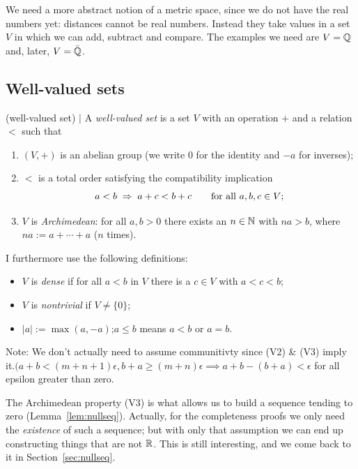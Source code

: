 We need a more abstract notion of a metric space, since we do not have the
real numbers yet: distances cannot be real numbers. Instead they take values
in a set $V$ in which we can add, subtract and compare. The examples we need
are $V=\mathbb{Q}$ and, later, $V=\bar{\mathbb{Q}}$.

\subsection{Well-valued sets}

\begin{definition} (well-valued set) $\mid$ \label{def:wellvalued}
A \emph{well-valued set} is a set $V$ with an operation $+$ and a relation $<$
such that
\begin{enumerate}[nosep,leftmargin=3em,label=(V\arabic*)]
    \item $(V,+)$ is an abelian group (we write $0$ for the identity and
    $-a$ for inverses);
    \item $<$ is a total order satisfying the compatibility implication
    \[ a<b \;\Rightarrow\; a+c<b+c \qquad\text{for all } a,b,c\in V; \]
    \item $V$ is \emph{Archimedean}: for all $a,b>0$ there exists an
    $n\in\mathbb{N}$ with $na>b$, where $na := a+\cdots+a$ ($n$ times).
\end{enumerate}
I furthermore use the following definitions:
\begin{itemize}[nosep,leftmargin=3em]
  \item $V$ is \emph{dense} if for all $a<b$ in $V$ there is a $c\in V$ with $a<c<b$;
  \item $V$ is \emph{nontrivial} if $V\ne\{0\}$;
  \item $|a| := \max(a,-a)$;\quad $a\le b$ means $a<b$ or $a=b$.
\end{itemize}
\end{definition}
Note: We don't actually need to assume communitivty since (V2) \& (V3) imply it.$ (a + b < (m+n+1) \epsilon, b+a \geq (m+n) \epsilon  \implies a+b - (b+a) < \epsilon $ for all epsilon greater than zero. 

The Archimedean property (V3) is what allows us to build a sequence tending to
zero (Lemma~\ref{lem:nullseq}). Actually, for the completeness proofs we only
need the \emph{existence} of such a sequence; but with only that assumption we
can end up constructing things that are not $\mathbb{R}$. This is still interesting,
and we come back to it in Section~\ref{sec:nullseq}.

